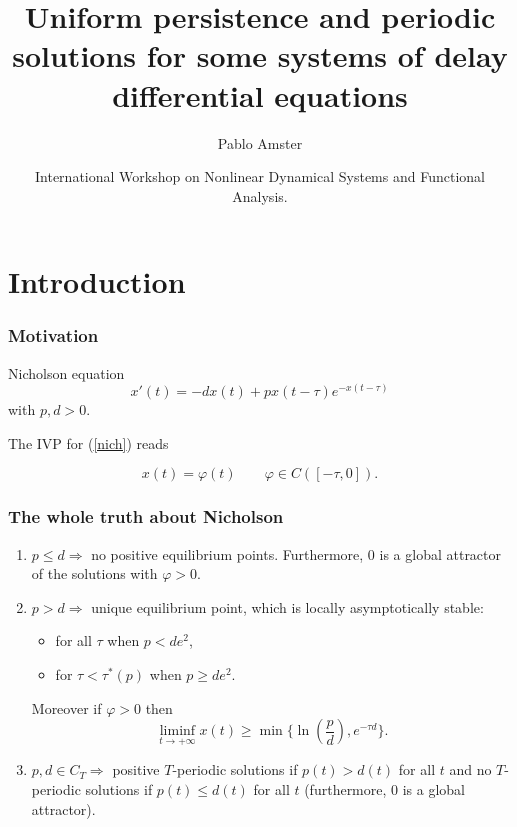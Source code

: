 \documentclass{beamer}
\title[Uniform persistence and  periodic solutions]{\bf {Uniform persistence and  periodic solutions} {for some systems of delay differential equations}}
\author[Pablo Amster]{Pablo Amster}
\institute[UBA-IMAS]{Universidad de Buenos Aires - IMAS  (CONICET)}
\date[Brasilia 2018]{International Workshop on Nonlinear Dynamical Systems and Functional Analysis.}
\begin{document}
\begin{frame}
\titlepage
\end{frame}



\section{Introduction}
\begin{frame}
 \frametitle{Motivation}
 Nicholson equation  
\begin{equation}
    \label{nich}
    x'(t)=-d x(t) + p x(t-\tau)e^{-x(t-\tau)}
\end{equation}
with $p,d>0$.

\medskip 

The IVP for (\ref{nich}) reads

$$x(t)=\varphi(t) \qquad \varphi\in C([-\tau,0]).
$$


\end{frame} 





\begin{frame} 
\frametitle{The whole truth about Nicholson}
\begin{enumerate}

    \item $p\le d \Longrightarrow$  no positive equilibrium points. 
    Furthermore,  $0$ is a global attractor of the solutions with $\varphi>0$. 
    \pause 
    \item $p>d \Longrightarrow$ unique equilibrium point, which is locally asymptotically stable: 
    
      \begin{itemize}
          \item  for all $\tau$ when $p<de^2$,
          \item  for $\tau<\tau^*(p)$ when $p\ge de^2$.
      \end{itemize}   Moreover if  $\varphi>0$  then $$\liminf_{t\to+\infty}x(t)\ge \min \{\ln \left(\frac pd\right), 
    e^{-\tau d}\}.$$
    \pause 
    \item $p, d \in C_T \Longrightarrow$   positive  $T$-periodic solutions if $p(t)>d(t)$ for all $t$ and no $T$-periodic solutions if $p(t)\le d(t)$ 
    for all $t$ (furthermore, $0$ is a global attractor). 
\end{enumerate}

\end{frame}
\end{document}
